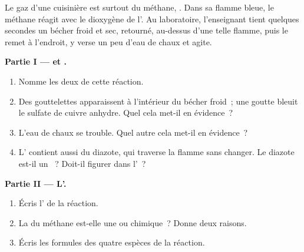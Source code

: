 \begin{problem}
\label{pb:g7:chemical-reactions:1}
Le gaz d'une cuisinière est surtout du méthane, . Dans sa flamme
bleue, le méthane réagit avec le dioxygène de l'. Au laboratoire,
l'enseignant tient quelques secondes un bécher froid et sec, retourné,
au-dessus d'une telle flamme, puis le remet à l'endroit, y verse un peu
d'eau de chaux et agite.

\medskip
\noindent\textbf{Partie I ---  et .}
\begin{enumerate}
  \item Nomme les deux  de cette réaction.
  \item Des gouttelettes apparaissent à l'intérieur du bécher froid~; une
        goutte bleuit le sulfate de cuivre anhydre. Quel  cela
        met-il en évidence~?
  \item L'eau de chaux se trouble. Quel autre  cela met-il en
        évidence~?
  \item L' contient aussi du diazote, qui traverse la flamme sans
        changer. Le diazote est-il un ~? Doit-il figurer dans
        l'~?
\end{enumerate}

\medskip
\noindent\textbf{Partie II --- L'.}
\begin{enumerate}[resume]
  \item Écris l' de la réaction.
  \item La  du méthane est-elle une  ou
        chimique~? Donne deux raisons.
  \item Écris les formules des quatre espèces de la réaction.
\end{enumerate}


\end{problem}
